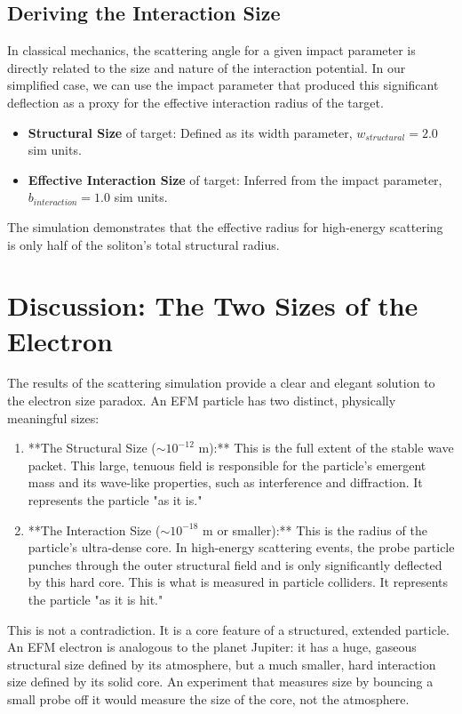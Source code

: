 \documentclass[11pt, twoside]{article}
\begin{document}
\subsection{Deriving the Interaction Size}
In classical mechanics, the scattering angle for a given impact parameter is directly related to the size and nature of the interaction potential. In our simplified case, we can use the impact parameter that produced this significant deflection as a proxy for the effective interaction radius of the target.
\begin{itemize}
    \item \textbf{Structural Size} of target: Defined as its width parameter, \(w_{structural} = 2.0\) sim units.
    \item \textbf{Effective Interaction Size} of target: Inferred from the impact parameter, \(b_{interaction} = 1.0\) sim units.
\end{itemize}

The simulation demonstrates that the effective radius for high-energy scattering is only half of the soliton's total structural radius.

\section{Discussion: The Two Sizes of the Electron}
The results of the scattering simulation provide a clear and elegant solution to the electron size paradox. An EFM particle has two distinct, physically meaningful sizes:
\begin{enumerate}
    \item **The Structural Size (\(\sim10^{-12}\) m):** This is the full extent of the stable wave packet. This large, tenuous field is responsible for the particle's emergent mass and its wave-like properties, such as interference and diffraction. It represents the particle "as it is."
    \item **The Interaction Size (\(\sim10^{-18}\) m or smaller):** This is the radius of the particle's ultra-dense core. In high-energy scattering events, the probe particle punches through the outer structural field and is only significantly deflected by this hard core. This is what is measured in particle colliders. It represents the particle "as it is hit."
\end{enumerate}
This is not a contradiction. It is a core feature of a structured, extended particle. An EFM electron is analogous to the planet Jupiter: it has a huge, gaseous structural size defined by its atmosphere, but a much smaller, hard interaction size defined by its solid core. An experiment that measures size by bouncing a small probe off it would measure the size of the core, not the atmosphere.
\end{document}
